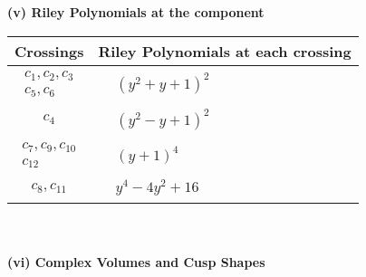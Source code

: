 \documentclass[1p]{elsarticle_modified}
\theoremstyle{definition}
\begin{document}
\newpage\renewcommand{\arraystretch}{1}
\flushleft \textbf{(v) Riley Polynomials at the component}\newline \\
\begin{tabular}{m{50pt}|m{274pt}}
Crossings & \hspace{64pt}Riley Polynomials at each crossing \\
\hline $$\begin{aligned}c_{1},c_{2},c_{3}\\c_{5},c_{6}\end{aligned}$$&$\begin{aligned}
&(y^2+y+1)^2
\end{aligned}$\\
\hline $$\begin{aligned}c_{4}\end{aligned}$$&$\begin{aligned}
&(y^2- y+1)^2
\end{aligned}$\\
\hline $$\begin{aligned}c_{7},c_{9},c_{10}\\c_{12}\end{aligned}$$&$\begin{aligned}
&(y+1)^4
\end{aligned}$\\
\hline $$\begin{aligned}c_{8},c_{11}\end{aligned}$$&$\begin{aligned}
&y^4-4 y^2+16
\end{aligned}$\\
\hline
\end{tabular}\\~\\
\newpage\flushleft \textbf{(vi) Complex Volumes and Cusp Shapes}
\end{document}
